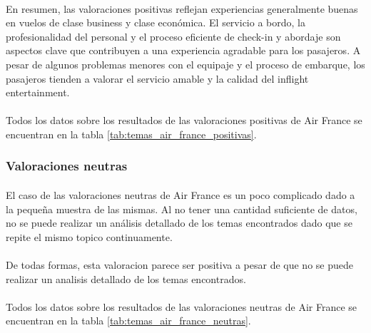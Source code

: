 \documentclass{report}
\begin{document}
{{                    \paragraph*{}{
                        En resumen, las valoraciones positivas reflejan experiencias generalmente buenas en vuelos de clase business y clase económica. El servicio a bordo, la profesionalidad del personal y el proceso eficiente de check-in y abordaje son aspectos clave que contribuyen a una experiencia agradable para los pasajeros. A pesar de algunos problemas menores con el equipaje y el proceso de embarque, los pasajeros tienden a valorar el servicio amable y la calidad del inflight entertainment.
                    }
                    \paragraph*{}{
                        Todos los datos sobre los resultados de las valoraciones positivas de Air France se encuentran en la tabla \ref{tab:temas_air_france_positivas}.
                    }
                \subsubsection*{Valoraciones neutras}
                    \paragraph*{}{
                        El caso de las valoraciones neutras de Air France es un poco complicado dado a la pequeña muestra de las mismas.
                        Al no tener una cantidad suficiente de datos, no se puede realizar un análisis detallado de los temas encontrados dado que se repite el mismo topico continuamente.
                    }
                    \paragraph*{}{
                        De todas formas, esta valoracion parece ser positiva a pesar de que no se puede realizar un analisis detallado de los temas encontrados.
                    }
                    \paragraph*{}{
                        Todos los datos sobre los resultados de las valoraciones neutras de Air France se encuentran en la tabla \ref{tab:temas_air_france_neutras}.
                    }
}}
\end{document}
